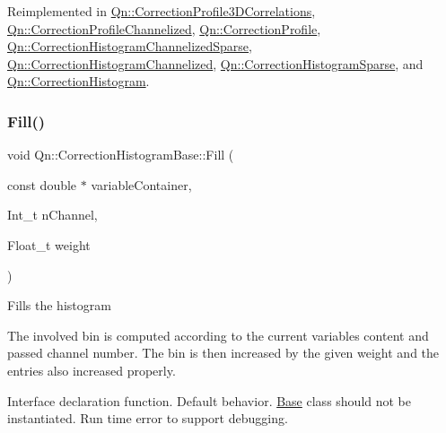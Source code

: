 Reimplemented in \mbox{\hyperlink{classQn_1_1CorrectionProfile3DCorrelations_abd5a109f482219cb8f8a48ec3fbf4f6d}{Qn\+::\+Correction\+Profile3\+D\+Correlations}}, \mbox{\hyperlink{classQn_1_1CorrectionProfileChannelized_ad063c82996e749fdf54526d3c627249b}{Qn\+::\+Correction\+Profile\+Channelized}}, \mbox{\hyperlink{classQn_1_1CorrectionProfile_a93b95da0e85f546097075ac1958e84e6}{Qn\+::\+Correction\+Profile}}, \mbox{\hyperlink{classQn_1_1CorrectionHistogramChannelizedSparse_adcd90b4926b6932cd9b50a9790d172b1}{Qn\+::\+Correction\+Histogram\+Channelized\+Sparse}}, \mbox{\hyperlink{classQn_1_1CorrectionHistogramChannelized_a9fee26c0616694e955b8785a2714b958}{Qn\+::\+Correction\+Histogram\+Channelized}}, \mbox{\hyperlink{classQn_1_1CorrectionHistogramSparse_a0bb5a6f7772532ed7a174cc688cf5b92}{Qn\+::\+Correction\+Histogram\+Sparse}}, and \mbox{\hyperlink{classQn_1_1CorrectionHistogram_a3704882797e987dc62c31d953f49ec7e}{Qn\+::\+Correction\+Histogram}}.

\mbox{\label{classQn_1_1CorrectionHistogramBase_ae94b20c7d396f5b179fb11d84d764c09}} 
\subsubsection{\texorpdfstring{Fill()}{Fill()}\hspace{0.1cm}{\footnotesize\ttfamily [2/2]}}
{\footnotesize\ttfamily void Qn\+::\+Correction\+Histogram\+Base\+::\+Fill (\begin{DoxyParamCaption}\item[{const double $\ast$}]{variable\+Container,  }\item[{Int\+\_\+t}]{n\+Channel,  }\item[{Float\+\_\+t}]{weight }\end{DoxyParamCaption})\hspace{0.3cm}{\ttfamily [virtual]}}

Fills the histogram

The involved bin is computed according to the current variables content and passed channel number. The bin is then increased by the given weight and the entries also increased properly.

Interface declaration function. Default behavior. \mbox{\hyperlink{classBase}{Base}} class should not be instantiated. Run time error to support debugging.


